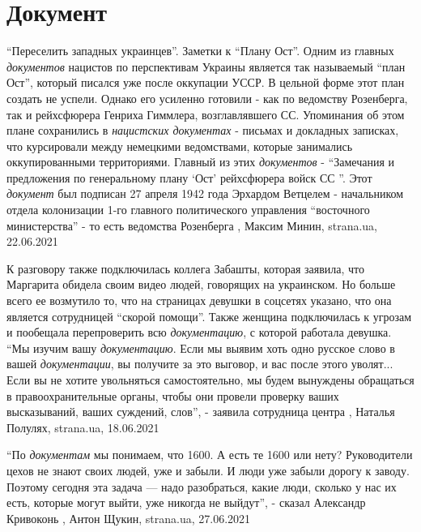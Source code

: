  
 
 
 
 
\chapter{Документ}
\label{sec:slova.dokument}

\enquote{Переселить западных украинцев}. Заметки к \enquote{Плану Ост}.  Одним
из главных \emph{документов} нацистов по перспективам Украины является так
называемый \enquote{план Ост}, который писался уже после оккупации УССР.  В
цельной форме этот план создать не успели. Однако его усиленно готовили - как
по ведомству Розенберга, так и рейхсфюрера Генриха Гиммлера, возглавлявшего СС.
Упоминания об этом плане сохранились в \emph{нацистских документах} - письмах и
докладных записках, что курсировали между немецкими ведомствами, которые
занимались оккупированными территориями.  Главный из этих \emph{документов} -
\enquote{Замечания и предложения по генеральному плану \enquote{Ост}
рейхсфюрера войск СС }. Этот \emph{документ} был подписан 27 апреля 1942 года
Эрхардом Ветцелем - начальником отдела колонизации 1-го главного политического
управления \enquote{восточного министерства} - то есть ведомства Розенберга
  , Максим Минин, strana.ua, 22.06.2021

К разговору также подключилась коллега Забашты, которая заявила, что Маргарита
обидела своим видео людей, говорящих на украинском. Но больше всего ее
возмутило то, что на страницах девушки в соцсетях указано, что она является
сотрудницей \enquote{скорой помощи}. Также женщина подключилась к угрозам и пообещала
перепроверить всю \emph{документацию}, с которой работала девушка.  \enquote{Мы изучим вашу
\emph{документацию}. Если мы выявим хоть одно русское слово в вашей \emph{документации}, вы
получите за это выговор, и вас после этого уволят... Если вы не хотите
увольняться самостоятельно, мы будем вынуждены обращаться в правоохранительные
органы, чтобы они провели проверку ваших высказываний, ваших суждений, слов}, -
заявила сотрудница центра 
,
Наталья Полулях, strana.ua, 18.06.2021

\enquote{По \emph{документам} мы понимаем, что 1600. А есть те 1600 или нету? Руководители
цехов не знают своих людей, уже и забыли. И люди уже забыли дорогу к заводу.
Поэтому сегодня эта задача — надо разобраться, какие люди, сколько у нас их
есть, которые могут выйти, уже никогда не выйдут}, - сказал Александр
Кривоконь
, Антон Щукин, strana.ua, 27.06.2021
